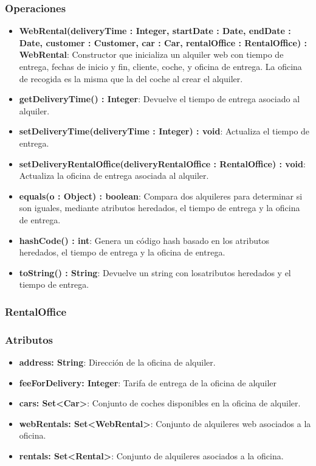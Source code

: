 \subsubsection*{Operaciones}

\begin{itemize}
    \item \textbf{WebRental(deliveryTime : Integer, startDate : Date, endDate : Date, customer : Customer, car : Car, rentalOffice : RentalOffice) : WebRental}: 
    Constructor que inicializa un alquiler web con tiempo de entrega, fechas de inicio y fin, cliente, coche, y oficina de entrega. La oficina de recogida es la misma que la del coche al crear el alquiler.

    \item \textbf{getDeliveryTime() : Integer}: Devuelve el tiempo de entrega asociado al alquiler.
    \item \textbf{setDeliveryTime(deliveryTime : Integer) : void}: Actualiza el tiempo de entrega. 
    \item \textbf{setDeliveryRentalOffice(deliveryRentalOffice : RentalOffice) : void}: Actualiza la oficina de entrega asociada al alquiler.
    \item \textbf{equals(o : Object) : boolean}: Compara dos alquileres para determinar si son iguales, mediante atributos heredados, el tiempo de entrega y la oficina de entrega.
    \item \textbf{hashCode() : int}: Genera un código hash basado en los atributos heredados, el tiempo de entrega y la oficina de entrega.
    \item \textbf{toString() : String}: Devuelve un string con losatributos heredados y el tiempo de entrega.
\end{itemize}

\subsubsection{RentalOffice}

\subsubsection*{Atributos}

\begin{itemize}
    \item \textbf{address: String}: Dirección de la oficina de alquiler. 
    \item \textbf{feeForDelivery: Integer}: Tarifa de entrega de la oficina de alquiler
    \item \textbf{cars: Set<Car>}: Conjunto de coches disponibles en la oficina de alquiler.
    \item \textbf{webRentals: Set<WebRental>}: Conjunto de alquileres web asociados a la oficina. 
    \item \textbf{rentals: Set<Rental>}: Conjunto de alquileres asociados a la oficina.
\end{itemize}

